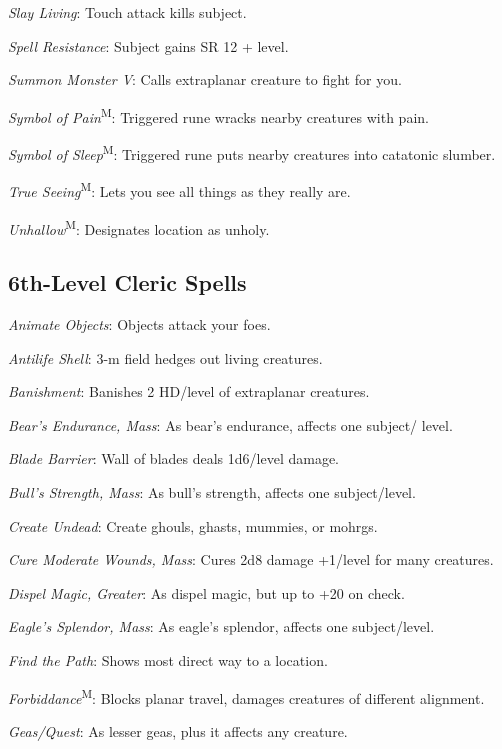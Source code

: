 \textit{Slay Living}: Touch attack kills subject.

\textit{Spell Resistance}: Subject gains SR 12 + level.

\textit{Summon Monster V}: Calls extraplanar creature to fight for you.

\textit{Symbol of Pain}\textsuperscript{M}: Triggered rune wracks nearby creatures with pain.

\textit{Symbol of Sleep}\textsuperscript{M}: Triggered rune puts nearby creatures into catatonic slumber.

\textit{True Seeing}\textsuperscript{M}: Lets you see all things as they really are.

\textit{Unhallow}\textsuperscript{M}: Designates location as unholy.




\subsection{6th-Level Cleric Spells}

\textit{Animate Objects}: Objects attack your foes.

\textit{Antilife Shell}: 3-m field hedges out living creatures.

\textit{Banishment}: Banishes 2 HD/level of extraplanar creatures.

\textit{Bear's Endurance, Mass}: As bear's endurance, affects one subject/ level.

\textit{Blade Barrier}: Wall of blades deals 1d6/level damage.

\textit{Bull's Strength, Mass}: As bull's strength, affects one subject/level.

\textit{Create Undead}: Create ghouls, ghasts, mummies, or mohrgs.

\textit{Cure Moderate Wounds, Mass}: Cures 2d8 damage +1/level for many creatures.

\textit{Dispel Magic, Greater}: As dispel magic, but up to +20 on check.

\textit{Eagle's Splendor, Mass}: As eagle's splendor, affects one subject/level.

\textit{Find the Path}: Shows most direct way to a location.

\textit{Forbiddance}\textsuperscript{M}: Blocks planar travel, damages creatures of different alignment.

\textit{Geas/Quest}: As lesser geas, plus it affects any creature.

